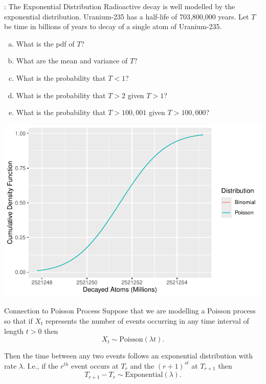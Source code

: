\begin{frame}
  \begin{block}{\example: The Exponential Distribution}
    Radioactive decay is well modelled by the exponential distribution. Uranium-235 has a half-life of 703,800,000 years. Let $T$ be time in billions of years to decay of a single atom of Uranium-235.

    \bigskip
    
    \begin{enumerate}[a)]
    \item What is the pdf of $T$?
    \item What are the mean and variance of $T$?
    \item What is the probability that $T<1$?
    \item What is the probability that $T>2$ given $T>1$?
    \item What is the probability that $T>100,001$ given $T>100,000$?
     \end{enumerate}
  \end{block}
\end{frame}




\begin{frame}
  \begin{block}{\examplectd}
    \begin{center}
      \includegraphics[height=.75\textheight]{figure/exercise2-1}
    \end{center}
  \end{block}
\end{frame}

\begin{frame}
  \begin{block}{Connection to Poisson Process}
    Suppose that we are modelling a Poisson process so that if $X_t$ represents the number of events occurring in any time interval of length $t>0$ then
    \[
      X_t \sim \mbox{Poisson}(\lambda t).
    \]

    \bigskip

    Then the time between any two events follows an exponential distribution with rate $\lambda$. I.e., if the $r^{th}$ event occurs at $T_r$ and the $(r+1)^{st}$ at $T_{r+1}$ then
    \[
      T_{r+1}-T_r \sim \mbox{Exponential}(\lambda).
    \]
    
  \end{block}
\end{frame}

